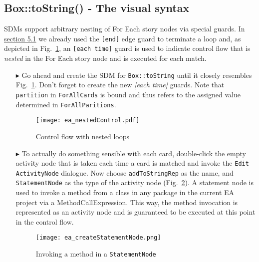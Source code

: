 \newpage
\subsection{Box::toString() - The visual syntax}
\visHeader
\hypertarget{stringRep vis}{}

SDMs support arbitrary nesting of For Each story nodes via special guards. In \hyperlink{emptyPartition vis}{section 5.1} 
we already used the \texttt{[end]} edge guard to terminate a loop and, as depicted in Fig.~\ref{fig:sdm_tostring_1}, an
\texttt{[each time]} guard is used to indicate control flow that is \emph{nested} in the For Each story node and is executed for each match.

\begin{itemize}

\item[$\blacktriangleright$] Go ahead and create the SDM for \texttt{Box::toString} until it closely resembles Fig.~\ref{fig:sdm_tostring_1}. Don't forget to
create the new \emph{[each time]} guards. Note that \texttt{partition} in \texttt{ForAllCards} is bound  and thus refers to the assigned value determined in
\texttt{ForAllParitions}.

\begin{figure}[htbp]
\begin{center}
  \texttt{[image: ea\_nestedControl.pdf]}
  \caption{Control flow with nested loops} 
  \label{fig:sdm_tostring_1}
\end{center}
\end{figure}


\item[$\blacktriangleright$] To actually do something sensible with each card, double-click the empty activity node that is taken each time a card is matched and invoke the \texttt{Edit
ActivityNode} dialogue. Now choose \texttt{addToStringRep} as the name, and \texttt{StatementNode} as the type of the activity node
(Fig.~\ref{fig:sdm_tostring_2}).  A statement node is used to invoke a method from a class in any package in the current EA project via a
MethodCallExpression. This way, the method invocation is represented as an activity node and is guaranteed to be executed at this point in the control flow.

\begin{figure}[htbp]
\begin{center}
  \texttt{[image: ea\_createStatementNode.png]}
  \caption{Invoking a method in a \texttt{StatementNode}}  
  \label{fig:sdm_tostring_2}
\end{center}
\end{figure}


\end{itemize}
